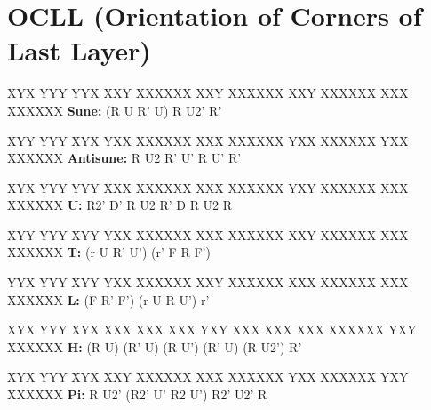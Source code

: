 \section{OCLL (Orientation of Corners of Last Layer)}

\begin{multicols}{2}

\RubikCubeGreyAll
\RubikFaceUp XYX YYY YYX
\RubikFaceFront XXY XXXXXX
\RubikFaceRight XXY XXXXXX
\RubikFaceBack XXY XXXXXX
\RubikFaceLeft XXX XXXXXX
	\noindent{}
\hspace{0.45cm}\textbf{Sune:} (R U R' U) R U2' R'
\vspace{0.2cm}

\RubikCubeGreyAll
\RubikFaceUp XYY YYY XYX
\RubikFaceFront YXX XXXXXX
\RubikFaceRight XXX XXXXXX
\RubikFaceBack YXX XXXXXX
\RubikFaceLeft YXX XXXXXX
	\noindent{}
\hspace{0.45cm}\textbf{Antisune:} R U2 R' U' R U' R'
\vspace{0.2cm}

\RubikCubeGreyAll
\RubikFaceUp XYX YYY YYY
\RubikFaceFront XXX XXXXXX
\RubikFaceRight XXX XXXXXX
\RubikFaceBack YXY XXXXXX
\RubikFaceLeft XXX XXXXXX
	\noindent{}
\hspace{0.45cm}\textbf{U:} R2' D' R U2 R' D R U2 R
\vspace{0.2cm}

\RubikCubeGreyAll
\RubikFaceUp XYY YYY XYY
\RubikFaceFront YXX XXXXXX
\RubikFaceRight XXX XXXXXX
\RubikFaceBack XXY XXXXXX
\RubikFaceLeft XXX XXXXXX
	\noindent{}
\hspace{0.45cm}\textbf{T:} (r U R' U') (r' F R F')
\vspace{0.2cm}

\RubikCubeGreyAll
\RubikFaceUp YYX YYY XYY
\RubikFaceFront YXX XXXXXX
\RubikFaceRight XXY XXXXXX
\RubikFaceBack XXX XXXXXX
\RubikFaceLeft XXX XXXXXX
	\noindent{}
\hspace{0.45cm}\textbf{L:} (F R' F') (r U R U') r'
\vspace{0.2cm}

\RubikCubeGreyAll
\RubikFaceUp XYX YYY XYX
\RubikFaceFront XXX XXX XXX
\RubikFaceRight YXY XXX XXX
\RubikFaceBack XXX XXXXXX
\RubikFaceLeft YXY XXXXXX
	\noindent{}
\hspace{0.45cm}\textbf{H:} (R U) (R' U) (R U') (R' U) (R U2') R'
\vspace{0.2cm}

\RubikCubeGreyAll
\RubikFaceUp XYX YYY XYX
\RubikFaceFront XXY XXXXXX
\RubikFaceRight XXX XXXXXX
\RubikFaceBack YXX XXXXXX
\RubikFaceLeft YXY XXXXXX
	\noindent{}
\hspace{0.2cm}\textbf{Pi:} R U2' (R2' U' R2 U') R2' U2' R

\end{multicols}

